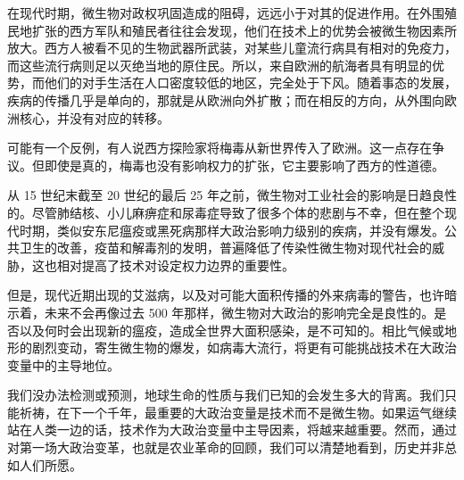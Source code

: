 在现代时期，微生物对政权巩固造成的阻碍，远远小于对其的促进作用。在外围殖民地扩张的西方军队和殖民者往往会发现，他们在技术上的优势会被微生物因素所放大。西方人被看不见的生物武器所武装，对某些儿童流行病具有相对的免疫力，而这些流行病则足以灭绝当地的原住民。所以，来自欧洲的航海者具有明显的优势，而他们的对手生活在人口密度较低的地区，完全处于下风。随着事态的发展，疾病的传播几乎是单向的，那就是从欧洲向外扩散；而在相反的方向，从外围向欧洲核心，并没有对应的转移。

可能有一个反例，有人说西方探险家将梅毒从新世界传入了欧洲。这一点存在争议。但即使是真的，梅毒也没有影响权力的扩张，它主要影响了西方的性道德。

从 15 世纪末截至 20 世纪的最后 25 年之前，微生物对工业社会的影响是日趋良性的。尽管肺结核、小儿麻痹症和尿毒症导致了很多个体的悲剧与不幸，但在整个现代时期，类似安东尼瘟疫或黑死病那样大政治影响力级别的疾病，并没有爆发。公共卫生的改善，疫苗和解毒剂的发明，普遍降低了传染性微生物对现代社会的威胁，这也相对提高了技术对设定权力边界的重要性。

但是，现代近期出现的艾滋病，以及对可能大面积传播的外来病毒的警告，也许暗示着，未来不会再像过去 500 年那样，微生物对大政治的影响完全是良性的。是否以及何时会出现新的瘟疫，造成全世界大面积感染，是不可知的。相比气候或地形的剧烈变动，寄生微生物的爆发，如病毒大流行，将更有可能挑战技术在大政治变量中的主导地位。

我们没办法检测或预测，地球生命的性质与我们已知的会发生多大的背离。我们只能祈祷，在下一个千年，最重要的大政治变量是技术而不是微生物。如果运气继续站在人类一边的话，技术作为大政治变量中主导因素，将越来越重要。然而，通过对第一场大政治变革，也就是农业革命的回顾，我们可以清楚地看到，历史并非总如人们所愿。